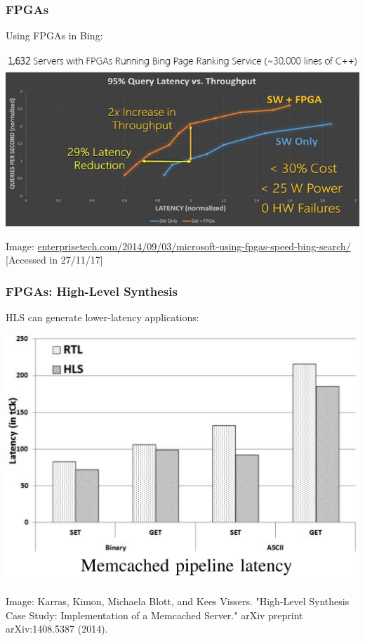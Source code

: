 \documentclass[10pt, compress, xcolor={table,xcdraw,usenames}, aspectratio=169]{beamer}
\begin{document}
\begin{frame}
    \frametitle{FPGAs}
    \begin{block}{Using FPGAs in \alert{Bing}:}
    \begin{center}
        \includegraphics[width=.7\textwidth]{fpga_bing}

        \scriptsize{Image:
        \url{enterprisetech.com/2014/09/03/microsoft-using-fpgas-speed-bing-search/}
        [Accessed in 27/11/17]}
    \end{center}
    \end{block}
\end{frame}

\begin{frame}
    \frametitle{FPGAs: High-Level Synthesis}
    \begin{block}{HLS can generate \alert{lower-latency applications}:}
    \begin{center}
        \includegraphics[width=.6\textwidth]{hls_latency}

        \scriptsize{Image: Karras, Kimon, Michaela Blott, and Kees Vissers.
        "High-Level Synthesis Case Study: Implementation of a Memcached
        Server." arXiv preprint arXiv:1408.5387 (2014).}
    \end{center}
    \end{block}
\end{frame}
\end{document}
